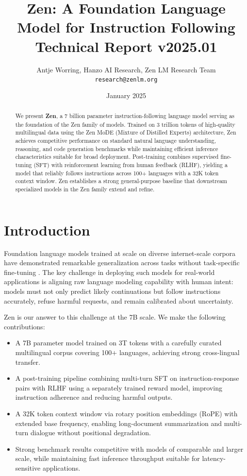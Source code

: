 \documentclass[11pt,a4paper]{article}
\title{\textbf{Zen: A Foundation Language Model for Instruction Following}\\
\large Technical Report v2025.01}
\author{Antje Worring, Hanzo AI Research, Zen LM Research Team\\
\texttt{research@zenlm.org}}
\date{January 2025}
\begin{document}
\maketitle

\begin{abstract}
We present \textbf{Zen}, a 7 billion parameter instruction-following language model serving as the
foundation of the Zen family of models. Trained on 3 trillion tokens of high-quality multilingual
data using the Zen MoDE (Mixture of Distilled Experts) architecture, Zen achieves competitive
performance on standard natural language understanding, reasoning, and code generation benchmarks
while maintaining efficient inference characteristics suitable for broad deployment. Post-training
combines supervised fine-tuning (SFT) with reinforcement learning from human feedback (RLHF),
yielding a model that reliably follows instructions across 100$+$ languages with a 32K token
context window. Zen establishes a strong general-purpose baseline that downstream specialized
models in the Zen family extend and refine.
\end{abstract}

\tableofcontents
\newpage

\section{Introduction}

Foundation language models trained at scale on diverse internet-scale corpora have demonstrated
remarkable generalization across tasks without task-specific fine-tuning \cite{brown2020gpt3,
wei2022emergent}. The key challenge in deploying such models for real-world applications is
aligning raw language modeling capability with human intent: models must not only predict likely
continuations but follow instructions accurately, refuse harmful requests, and remain calibrated
about uncertainty.

Zen is our answer to this challenge at the 7B scale. We make the following contributions:

\begin{itemize}
  \item A 7B parameter model trained on 3T tokens with a carefully curated multilingual corpus
        covering 100$+$ languages, achieving strong cross-lingual transfer.
  \item A post-training pipeline combining multi-turn SFT on instruction-response pairs with RLHF
        using a separately trained reward model, improving instruction adherence and reducing
        harmful outputs.
  \item A 32K token context window via rotary position embeddings (RoPE) with extended base
        frequency, enabling long-document summarization and multi-turn dialogue without positional
        degradation.
  \item Strong benchmark results competitive with models of comparable and larger scale, while
        maintaining fast inference throughput suitable for latency-sensitive applications.
\end{itemize}
\end{document}
